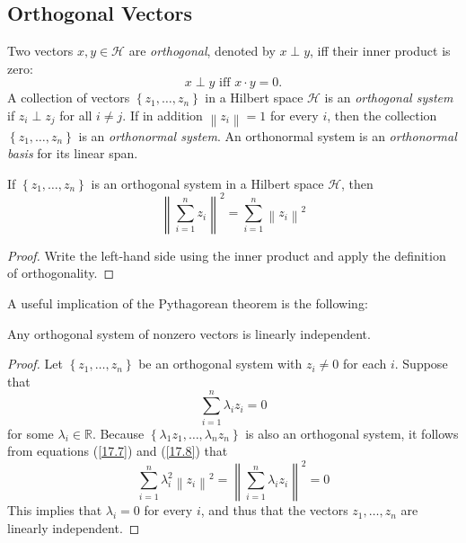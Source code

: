 \documentclass[\topdir/lecture\_notes.tex]{subfiles}
\begin{document}
\subsection{Orthogonal Vectors}
Two vectors \(x, y \in \mathcal{H}\) are \emph{orthogonal}, denoted by \(x \perp y\), iff their inner product is zero:
\begin{equation*}
x \perp y \text { iff } x \cdot y=0. 
\end{equation*}
A collection of vectors \(\left\{z_{1}, \ldots, z_{n}\right\}\) in a Hilbert space \(\mathcal{H}\) is an \emph{orthogonal system} if \(z_{i} \perp z_{j}\) for all \(i \neq j\). If in addition \(\left\|z_{i}\right\|=1\) for every \(i\), then the collection \(\left\{z_{1}, \ldots, z_{n}\right\}\) is an \emph{orthonormal system}. An orthonormal system is an \emph{orthonormal basis} for its linear span.
\begin{theorem}\label{thm:pythagorean}
If \(\left\{z_{1}, \ldots, z_{n}\right\}\) is an orthogonal system in a Hilbert space \(\mathcal{H}\), then
\begin{equation}
\left\|\sum_{i=1}^{n} z_{i}\right\|^{2}=\sum_{i=1}^{n}\left\|z_{i}\right\|^{2} \label{17.7}
\end{equation}
\end{theorem}
\begin{proof}
Write the left-hand side using the inner product and apply the definition of orthogonality.
\end{proof}
A useful implication of the Pythagorean theorem is the following:
\begin{theorem}\label{thm:orthogonal_independence}
Any orthogonal system of nonzero vectors is linearly independent.
\end{theorem}
\begin{proof}
Let \(\left\{z_{1}, \ldots, z_{n}\right\}\) be an orthogonal system with \(z_{i} \neq 0\) for each \(i\). Suppose that
\begin{equation}
\sum_{i=1}^{n} \lambda_{i} z_{i}=0 \label{17.8}
\end{equation}
for some \(\lambda_{i} \in \mathbb{R}\). Because \(\left\{\lambda_{1} z_{1}, \ldots, \lambda_{n} z_{n}\right\}\) is also an orthogonal system, it follows from equations (\ref{17.7}) and (\ref{17.8}) that
\begin{equation*}
\sum_{i=1}^{n} \lambda_{i}^{2}\left\|z_{i}\right\|^{2}=\left\|\sum_{i=1}^{n} \lambda_{i} z_{i}\right\|^{2}=0 
\end{equation*}
This implies that \(\lambda_{i}=0\) for every \(i\), and thus that the vectors \(z_{1}, \ldots, z_{n}\) are linearly independent.
\end{proof}
\end{document}
